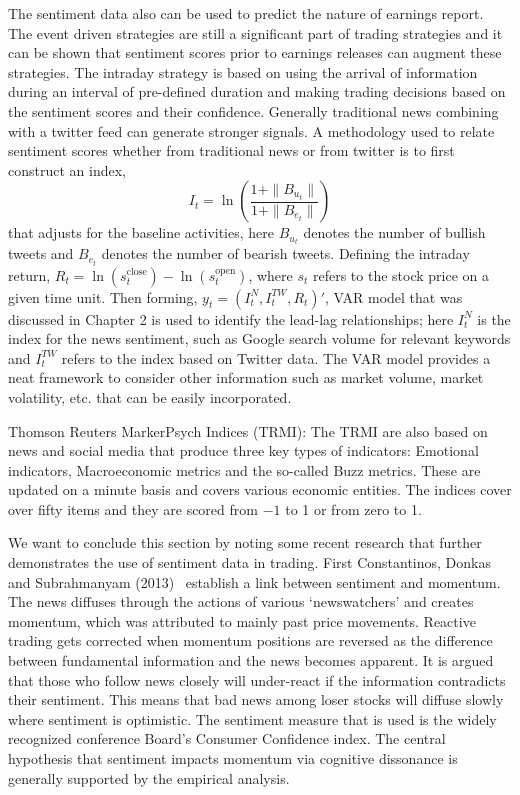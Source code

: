 The sentiment data also can be used to predict the nature of earnings report. The event driven strategies are still a significant part of trading strategies and it can be shown that sentiment scores prior to earnings releases can augment these strategies. The intraday strategy is based on using the arrival of information during an interval of pre-defined duration and making trading decisions based on the sentiment scores and their confidence. Generally traditional news combining with a twitter feed can generate stronger signals. A methodology used to relate sentiment scores whether from traditional news or from twitter is to first construct an index, 
	\begin{equation}\label{eqn:itwithln}
	I_t= \ln\left( \dfrac{1+\|B_{u_t}\|}{1+\| B_{e_t}\|}\right)
	\end{equation}  
that adjusts for the baseline activities, here $B_{u_t}$ denotes the number of bullish tweets and $B_{e_t}$ denotes the number of bearish tweets. Defining the intraday return, $R_t= \ln(s_t^{\text{close}}) - \ln(s_t^{\text{open}})$, where $s_t$ refers to the stock price on a given time unit. Then forming, $y_t=(I_t^N,I_t^{TW},R_t)'$, VAR model that was discussed in Chapter 2 is used to identify the lead-lag relationships; here $I_t^N$ is the index for the news sentiment, such as Google search volume for relevant keywords and $I_t^{TW}$ refers to the index based on Twitter data. The VAR model provides a neat framework to consider other information such as market volume, market volatility, etc. that can be easily incorporated. 


Thomson Reuters MarkerPsych Indices (TRMI): The TRMI are also based on news and social media that produce three key types of indicators: Emotional indicators, Macroeconomic metrics and the so-called Buzz metrics. These are updated on a minute basis and covers various economic entities. The indices cover over fifty items and they are scored from $-1$ to 1 or from zero to 1. 


We want to conclude this section by noting some recent research that further demonstrates the use of sentiment data in trading. First Constantinos, Donkas and Subrahmanyam (2013)~\cite{contdonksub13} establish a link between sentiment and momentum. The news diffuses through the actions of various `newswatchers' and creates momentum, which was attributed to mainly past price movements. Reactive trading gets corrected when momentum positions are reversed as the difference between fundamental information and the news becomes apparent. It is argued that those who follow news closely will under-react if the information contradicts their sentiment. This means that bad news among loser stocks will diffuse slowly where sentiment is optimistic. The sentiment measure that is used is the widely recognized conference Board's Consumer Confidence index. The central hypothesis that sentiment impacts momentum via cognitive dissonance is generally supported by the empirical analysis.



